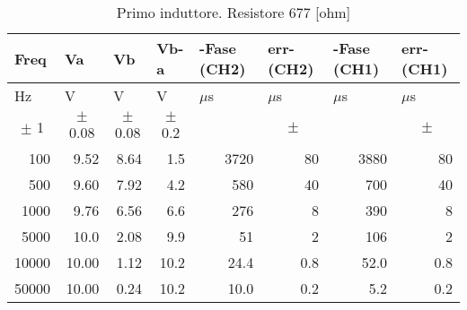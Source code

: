\begin{table}[H]
\begin{center}
\begin{tabular}{|r|r|r|r|r|r|r|r|}
\hline
\multicolumn{1}{|l|}{Freq} & \multicolumn{1}{l|}{Va} & \multicolumn{1}{l|}{Vb} & \multicolumn{1}{l|}{Vb-a} & \multicolumn{1}{l|}{-Fase (CH2)} & \multicolumn{1}{l|}{err-(CH2)} & \multicolumn{1}{l|}{-Fase (CH1)} & \multicolumn{1}{l|}{err-(CH1)} \\ \hline
\multicolumn{1}{|l|}{Hz} & \multicolumn{1}{l|}{V} & \multicolumn{1}{l|}{V} & \multicolumn{1}{l|}{V} & \multicolumn{1}{l|}{$\mu$s} & \multicolumn{1}{l|}{$\mu$s} & \multicolumn{1}{l|}{$\mu$s} & \multicolumn{1}{l|}{$\mu$s} \\ \hline
\multicolumn{1}{|c|}{$\pm$ 1} & \multicolumn{1}{c|}{$\pm$ 0.08} & \multicolumn{1}{c|}{$\pm$ 0.08} & \multicolumn{1}{c|}{$\pm$ 0.2} & \multicolumn{1}{c|}{} & \multicolumn{1}{c|}{$\pm$ } & \multicolumn{1}{l|}{} & \multicolumn{1}{c|}{$\pm$ } \\ \hline
100 & 9.52 & 8.64 & 1.5 & 3720 & 80 & 3880 & 80 \\ \hline
500 & 9.60 & 7.92 & 4.2 & 580 & 40 & 700 & 40 \\ \hline
1000 & 9.76 & 6.56 & 6.6 & 276 & 8 & 390 & 8 \\ \hline
5000 & 10.0 & 2.08 & 9.9 & 51 & 2 & 106 & 2 \\ \hline
10000 & 10.00 & 1.12 & 10.2 & 24.4 & 0.8 & 52.0 & 0.8 \\ \hline
50000 & 10.00 & 0.24 & 10.2 & 10.0 & 0.2 & 5.2 & 0.2 \\ \hline
\end{tabular}
\end{center}
\caption{Primo induttore. Resistore 677 [ohm]}
\label{C3_P1_ind1}
\end{table}